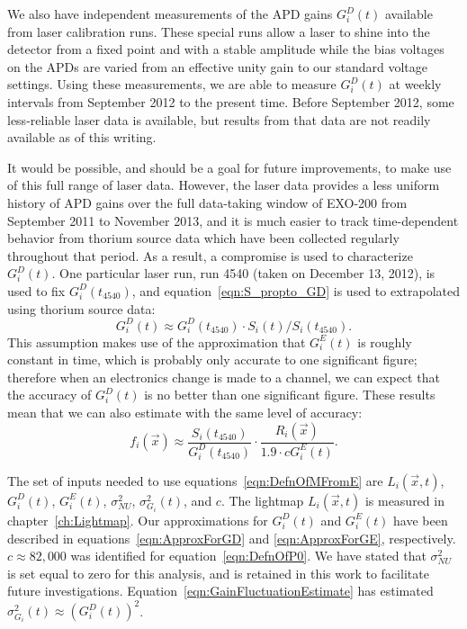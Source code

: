 We also have independent measurements of the APD gains $G^D_i(t)$ available from laser calibration runs.  These special runs allow a laser to shine into the detector from a fixed point and with a stable amplitude while the bias voltages on the APDs are varied from an effective unity gain to our standard voltage settings.  Using these measurements, we are able to measure $G^D_i(t)$ at weekly intervals from September 2012 to the present time.  Before September 2012, some less-reliable laser data is available, but results from that data are not readily available as of this writing.

It would be possible, and should be a goal for future improvements, to make use of this full range of laser data.  However, the laser data provides a less uniform history of APD gains over the full data-taking window of EXO-200 from September 2011 to November 2013, and it is much easier to track time-dependent behavior from thorium source data which have been collected regularly throughout that period.  As a result, a compromise is used to characterize $G^D_i(t)$.  One particular laser run, run 4540 (taken on December 13, 2012), is used to fix $G^D_i(t_{4540})$, and equation~\ref{eqn:S_propto_GD} is used to extrapolated using thorium source data:
\begin{equation}\label{eqn:ApproxForGD}
G^D_i(t) \approx G^D_i(t_{4540}) \cdot S_i(t)/S_i(t_{4540}).
\end{equation}
This assumption makes use of the approximation that $G^E_i(t)$ is roughly constant in time, which is probably only accurate to one significant figure; therefore when an electronics change is made to a channel, we can expect that the accuracy of $G^D_i(t)$ is no better than one significant figure.  These results mean that we can also estimate with the same level of accuracy:
\begin{equation}
f_i(\vec{x}) \approx \frac{S_i(t_{4540})}{G^D_i(t_{4540})} \cdot \frac{R_i(\vec{x})}{1.9 \cdot c G^E_i(t)}.
\end{equation}

The set of inputs needed to use equations~\ref{eqn:DefnOfMFromE} are $L_i(\vec{x},t)$, $G_i^D(t)$, $G_i^E(t)$, $\sigma_{NU}^2$, $\sigma_{G_i}^2(t)$, and $c$.  The lightmap $L_i(\vec{x},t)$ is measured in chapter~\ref{ch:Lightmap}.  Our approximations for $G_i^D(t)$ and $G_i^E(t)$ have been described in equations~\ref{eqn:ApproxForGD} and \ref{eqn:ApproxForGE}, respectively.  $c \approx 82,000$ was identified for equation~\ref{eqn:DefnOfP0}.  We have stated that $\sigma_{NU}^2$ is set equal to zero for this analysis, and is retained in this work to facilitate future investigations.  Equation~\ref{eqn:GainFluctuationEstimate} has estimated $\sigma^2_{G_i}(t) \approx \left(G^D_i(t)\right)^2$.

